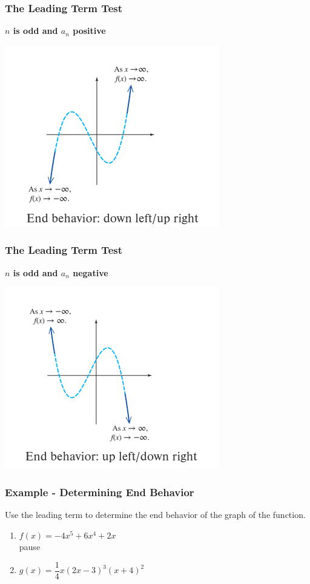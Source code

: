 \documentclass{beamer}
\begin{document}
\begin{frame}
    \frametitle{The Leading Term Test}


    \textbf{\(n\) is odd and \(a_n\) positive}

    \includegraphics[scale=0.5]{figs/fig_7.png}

\end{frame}


\begin{frame}
    \frametitle{The Leading Term Test}


    \textbf{\(n\) is odd and \(a_n\) negative}

    \includegraphics[scale=0.5]{figs/fig_8.png}

\end{frame}

\begin{frame}
    \frametitle{Example - Determining End Behavior}

    Use the leading term to determine the end behavior of the graph of the function. 
    \begin{enumerate}
        \item \(f(x) = -4x^5 + 6x^4 +2x\) \\pause
        \item \(g(x)= \dfrac{1}{4}x(2x-3)^3(x+4)^2\)
    \end{enumerate}

\end{frame}
\end{document}
